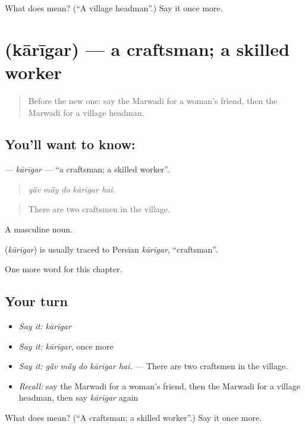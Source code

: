 \begin{tcolorbox}[breakable,colback=teal!4,colframe=teal!35!black,title={Before you move on}]
What does  mean? (\textquotedblleft{}A village headman\textquotedblright{}.) Say it once more.
\end{tcolorbox}
\section[\texorpdfstring{\mw{कारीगर} (kārīgar)}{कारीगर (kārīgar)}]{ (kārīgar) — a craftsman; a skilled worker}

\label{lesson:MW-C262-karigar}



\begin{quote}
Before the new one: say the Marwadi for a woman's friend, then the Marwadi for a village headman.
\end{quote}

\subsection*{You'll want to know: }
\textbf{} — \emph{kārīgar} — \textquotedblleft{}a craftsman; a skilled worker\textquotedblright{}.

\begin{quote}
    
\end{quote}

\begin{quote}
\emph{gā̃v mā̃y do kārīgar hai.}
\end{quote}

\begin{quote}
There are two craftsmen in the village.
\end{quote}

A masculine noun.

\begin{cousinweb}
\textbf{} (\emph{kārīgar}) is usually traced to Persian \emph{kārīgar}, \textquotedblleft{}craftsman\textquotedblright{}.
\end{cousinweb}

\begin{grammarlens}[title={What you've built}]
One more word for this chapter.
\end{grammarlens}

\subsection*{Your turn}
\begin{itemize}
\raggedright
  \item \emph{Say it:} \emph{kārīgar}
  \item \emph{Say it:} \emph{kārīgar}, once more
  \item \emph{Say it:} \emph{gā̃v mā̃y do kārīgar hai.} — There are two craftsmen in the village.
  \item \emph{Recall:} say the Marwadi for a woman's friend, then the Marwadi for a village headman, then say \emph{kārīgar} again
\end{itemize}

\begin{tcolorbox}[breakable,colback=teal!4,colframe=teal!35!black,title={Before you move on}]
What does  mean? (\textquotedblleft{}A craftsman; a skilled worker\textquotedblright{}.) Say it once more.
\end{tcolorbox}
